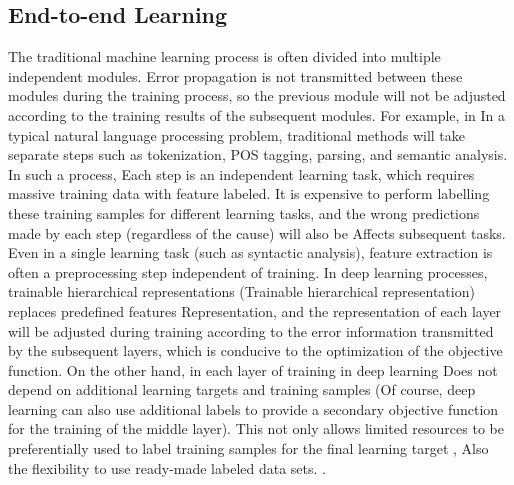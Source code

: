 \documentclass[11pt,en]{elegantpaper}
\begin{document}
\subsection{End-to-end Learning}
The traditional machine learning process is often divided into multiple independent modules. Error propagation is not transmitted between these modules during the training process, so the previous module will not be adjusted according to the training results of the subsequent modules\cite{Ringer2018}. For example, in In a typical natural language processing problem, traditional methods will take separate steps such as tokenization, POS tagging, parsing, and semantic analysis. In such a process, Each step is an independent learning task, which requires massive training data with feature labeled. It is expensive to perform labelling these training samples for different learning tasks, and the wrong predictions made by each step (regardless of the cause) will also be Affects subsequent tasks. Even in a single learning task (such as syntactic analysis), feature extraction is often a preprocessing step independent of training. In deep learning processes, trainable hierarchical representations (Trainable hierarchical representation) replaces predefined features Representation, and the representation of each layer will be adjusted during training according to the error information transmitted by the subsequent layers, which is conducive to the optimization of the objective function\cite{31}. On the other hand, in each layer of training in deep learning Does not depend on additional learning targets and training samples (Of course, deep learning can also use additional labels to provide a secondary objective function for the training of the middle layer). This not only allows limited resources to be preferentially used to label training samples for the final learning target , Also the flexibility to use ready-made labeled data sets.
.
\end{document}
